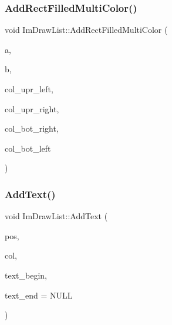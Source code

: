 \mbox{\label{struct_im_draw_list_ab658e574f3ef67a8d6cc0a86f13f5176}} 
\subsubsection{\texorpdfstring{Add\+Rect\+Filled\+Multi\+Color()}{AddRectFilledMultiColor()}}
{\footnotesize\ttfamily void Im\+Draw\+List\+::\+Add\+Rect\+Filled\+Multi\+Color (\begin{DoxyParamCaption}\item[{const \mbox{\hyperlink{struct_im_vec2}{Im\+Vec2}} \&}]{a,  }\item[{const \mbox{\hyperlink{struct_im_vec2}{Im\+Vec2}} \&}]{b,  }\item[{\mbox{\hyperlink{imgui_8h_a118cff4eeb8d00e7d07ce3d6460eed36}{Im\+U32}}}]{col\+\_\+upr\+\_\+left,  }\item[{\mbox{\hyperlink{imgui_8h_a118cff4eeb8d00e7d07ce3d6460eed36}{Im\+U32}}}]{col\+\_\+upr\+\_\+right,  }\item[{\mbox{\hyperlink{imgui_8h_a118cff4eeb8d00e7d07ce3d6460eed36}{Im\+U32}}}]{col\+\_\+bot\+\_\+right,  }\item[{\mbox{\hyperlink{imgui_8h_a118cff4eeb8d00e7d07ce3d6460eed36}{Im\+U32}}}]{col\+\_\+bot\+\_\+left }\end{DoxyParamCaption})}

\mbox{\label{struct_im_draw_list_ac5221bd86b3429f6d5b6e6ffe454942d}} 
\subsubsection{\texorpdfstring{Add\+Text()}{AddText()}\hspace{0.1cm}{\footnotesize\ttfamily [1/2]}}
{\footnotesize\ttfamily void Im\+Draw\+List\+::\+Add\+Text (\begin{DoxyParamCaption}\item[{const \mbox{\hyperlink{struct_im_vec2}{Im\+Vec2}} \&}]{pos,  }\item[{\mbox{\hyperlink{imgui_8h_a118cff4eeb8d00e7d07ce3d6460eed36}{Im\+U32}}}]{col,  }\item[{const char $\ast$}]{text\+\_\+begin,  }\item[{const char $\ast$}]{text\+\_\+end = {\ttfamily NULL} }\end{DoxyParamCaption})}

